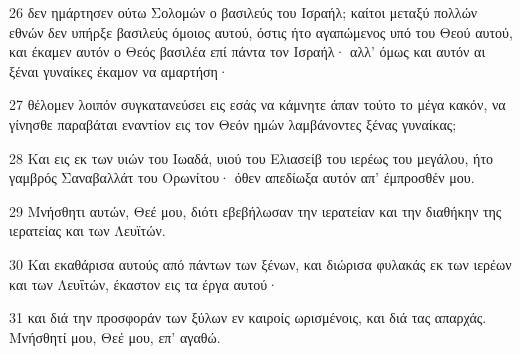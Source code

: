 \par 26 δεν ημάρτησεν ούτω Σολομών ο βασιλεύς του Ισραήλ; καίτοι μεταξύ πολλών εθνών δεν υπήρξε βασιλεύς όμοιος αυτού, όστις ήτο αγαπώμενος υπό του Θεού αυτού, και έκαμεν αυτόν ο Θεός βασιλέα επί πάντα τον Ισραήλ· αλλ' όμως και αυτόν αι ξέναι γυναίκες έκαμον να αμαρτήση·
\par 27 θέλομεν λοιπόν συγκατανεύσει εις εσάς να κάμνητε άπαν τούτο το μέγα κακόν, να γίνησθε παραβάται εναντίον εις τον Θεόν ημών λαμβάνοντες ξένας γυναίκας;
\par 28 Και εις εκ των υιών του Ιωαδά, υιού του Ελιασείβ του ιερέως του μεγάλου, ήτο γαμβρός Σαναβαλλάτ του Ορωνίτου· όθεν απεδίωξα αυτόν απ' έμπροσθέν μου.
\par 29 Μνήσθητι αυτών, Θεέ μου, διότι εβεβήλωσαν την ιερατείαν και την διαθήκην της ιερατείας και των Λευϊτών.
\par 30 Και εκαθάρισα αυτούς από πάντων των ξένων, και διώρισα φυλακάς εκ των ιερέων και των Λευΐτών, έκαστον εις τα έργα αυτού·
\par 31 και διά την προσφοράν των ξύλων εν καιροίς ωρισμένοις, και διά τας απαρχάς. Μνήσθητί μου, Θεέ μου, επ' αγαθώ.


